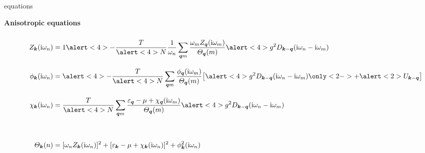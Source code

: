 \documentclass[10pt]{beamer}
\begin{document}
    \begin{frame}[label=Eliashberg1]{ equations}
        \begin{center} \bf
            Anisotropic equations
        \end{center}
        \begin{align*}
            Z_{\vec k}(\I \omega_n) &= 1 \alert<4> - \frac T {\alert<4> N}
            \frac 1 {\omega_n} \sum_{\vec q m} \frac
                {\omega_m Z_{\vec q}(\I \omega_m)}
                {\Theta_{\vec q}(m)}
            \alert<4>{g^2 D_{\vec k - \vec q}(\I \omega_n - \I \omega_m)}
            \vspacing
            \\
            \phi_{\vec k}(\I \omega_n) &= \alert<4> -\frac T {\alert<4> N}
            \sum_{\vec q m} \frac
                {\phi_{\vec q}(\I \omega_m)}
                {\Theta_{\vec q}(m)}
            \big[ \alert<4>{g^2 D_{\vec k - \vec q}(\I \omega_n - \I \omega_m)
            \only<2->{+ \alert<2>{U_{\vec k - \vec q}}}} \big]
            \vspacing
            \\
            \chi_{\vec k}(\I \omega_n) &= \frac T {\alert<4> N}
            \sum_{\vec q m} \frac
                {\epsilon_{\vec q} - \mu + \chi_{\vec q}(\I \omega_m)}
                {\Theta_{\vec q}(m)}
            \alert<4>{g^2 D_{\vec k - \vec q}(\I \omega_n - \I \omega_m)}
            \vspacing
            \\
            \hspace{2cm} & \hspace{8cm}
            \\
            \Theta_{\vec k}(n) &= [\omega_n Z_{\vec k}(\I \omega_n)]^2
            + [\epsilon_{\vec k} - \mu + \chi_{\vec k}(\I \omega_n)]^2
            + \phi^2_{\vec k}(\I \omega_n)
            \vspacing
        \end{align*}
    \end{frame}

    \addtocounter{framenumber}{-1}
\end{document}

